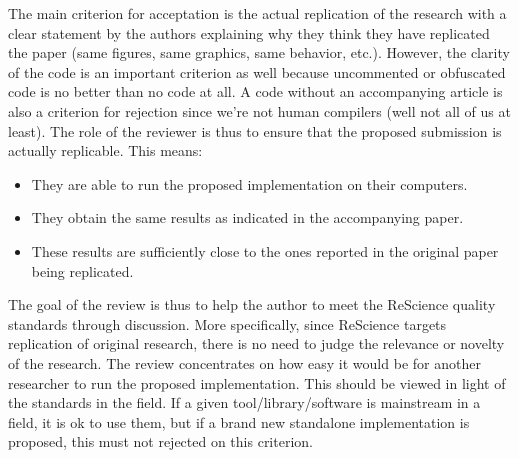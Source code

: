 \documentclass[a4paper,10pt, twocolumn]{article}
\begin{document}
The main criterion for acceptation is the actual replication of the research
with a clear statement by the authors explaining why they think they have
replicated the paper (same figures, same graphics, same behavior,
etc.). However, the clarity of the code is an important criterion as well because
uncommented or obfuscated code is no better than no code at all. A code without an
accompanying article is also a criterion for rejection since we’re not human
compilers (well not all of us at least). The role of the reviewer is thus to
ensure that the proposed submission is actually replicable. This means:
%
\begin{itemize}
\item They are able to run the proposed implementation on their computers.
\item They obtain the same results as indicated in the accompanying paper.
\item These results are sufficiently close to the ones reported in the original paper being replicated.
\end{itemize}
%
The goal of the review is thus to help the author to meet the ReScience quality
standards through discussion. More specifically, since ReScience targets
replication of original research, there is no need to judge the relevance or
novelty of the research. The review concentrates on how easy it would be for
another researcher to run the proposed implementation. This should be viewed in
light of the standards in the field. If a given tool/library/software is
mainstream in a field, it is ok to use them, but if a brand new standalone
implementation is proposed, this must not rejected on this criterion.



\end{document}
